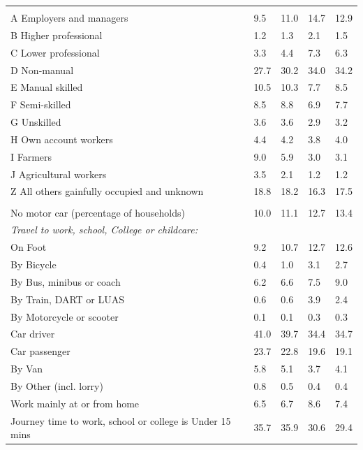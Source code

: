 \documentclass{article}
\begin{document}
\begin{table}[h]
\begin{tabular}{KTTTT}
\hline
    \\ 
    \hline
A Employers and managers &  9.5& 11.0& 14.7& 12.9\\
B Higher professional & 1.2& 1.3& 2.1& 1.5\\
C Lower professional & 3.3& 4.4& 7.3& 6.3\\
D Non-manual & 27.7& 30.2& 34.0& 34.2\\
E Manual skilled & 10.5& 10.3&  7.7&  8.5\\
F Semi-skilled & 8.5& 8.8& 6.9& 7.7\\
G Unskilled & 3.6& 3.6& 2.9& 3.2\\
H Own account workers & 4.4& 4.2& 3.8& 4.0\\
I Farmers & 9.0& 5.9& 3.0& 3.1\\
J Agricultural workers & 3.5& 2.1& 1.2& 1.2\\
Z All others gainfully occupied and unknown & 18.8& 18.2& 16.3& 17.5\\
\hline
{}\hline
    \\ 
    \hline
No motor car (percentage of households) & 10.0& 11.1& 12.7& 
13.4\\
    \hline 
\emph{Travel to work, school, College or childcare:} & & & \\
\quad On Foot &  9.2& 10.7& 12.7& 12.6\\ 
\quad By Bicycle & 0.4& 1.0& 3.1& 2.7\\ 
\quad By Bus, minibus or coach & 6.2& 6.6& 7.5& 9.0\\
\quad By Train, DART or LUAS & 0.6& 0.6& 3.9& 2.4\\
\quad By Motorcycle or scooter & 0.1& 0.1& 0.3& 0.3\\
\quad Car driver & 41.0 & 39.7& 34.4& 34.7\\
\quad Car passenger & 23.7& 22.8& 19.6& 19.1\\
\quad By Van & 5.8& 5.1& 3.7& 4.1\\
\quad By Other (incl. lorry) & 0.8& 0.5& 0.4& 0.4\\
    \hline
Work mainly at or from home & 6.5& 6.7& 8.6& 7.4\\
Journey time to work, school or college is Under 15 mins & 35.7& 35.9& 30.6& 29.4\\

\end{tabular}
\end{table}
\end{document}

